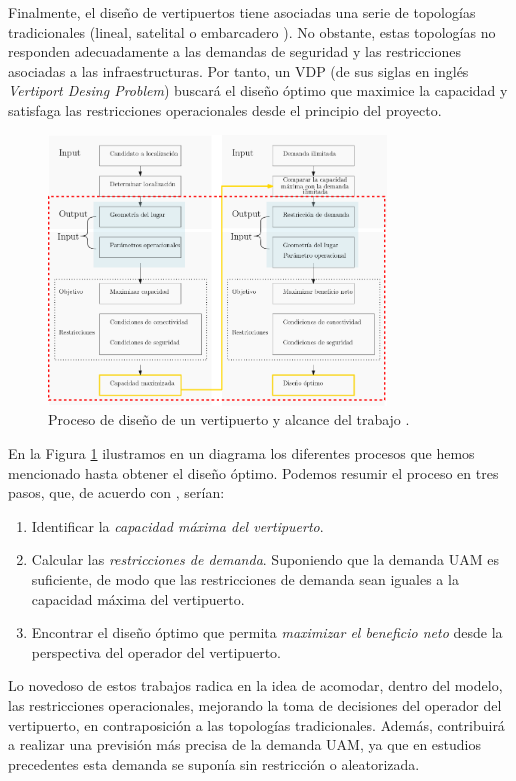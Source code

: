 \documentclass[12pt,a4paper]{book}
\begin{document}
Finalmente, el diseño de vertipuertos tiene asociadas una serie de topologías tradicionales (lineal, satelital o embarcadero \cite{preis_quick_2021}). No obstante, estas topologías no responden adecuadamente a las demandas de seguridad y las restricciones asociadas a las infraestructuras. Por tanto, un VDP (de sus siglas en inglés \textsl{Vertiport Desing Problem}) buscará el diseño óptimo que maximice la capacidad y satisfaga las restricciones operacionales desde el principio del proyecto.

\begin{figure}[h]
    \begin{center}
    \includegraphics[width=0.8\textwidth]{img/proceso_diseno_vertipuerto.png}
    \end{center}
    \caption{Proceso de diseño de un vertipuerto y alcance del trabajo  \cite{park_vertiport_2022}.}
    \label{fig:proceso-diseño-VDP}
\end{figure} 

En la Figura \ref{fig:proceso-diseño-VDP} ilustramos en un diagrama los diferentes procesos que hemos mencionado hasta obtener el diseño óptimo. Podemos resumir el proceso en tres pasos, que, de acuerdo con \cite{park_vertiport_2022}, serían:  
\begin{enumerate}
	\item Identificar la \textsl{capacidad máxima del vertipuerto}. 
	\item Calcular las \textsl{restricciones de demanda}. Suponiendo que la demanda UAM es suficiente, de modo que las restricciones de demanda sean iguales a la capacidad máxima del vertipuerto. 
	\item Encontrar el diseño óptimo que permita \textsl{maximizar el beneficio neto} desde la perspectiva del operador del vertipuerto. 
\end{enumerate} 
Lo novedoso de estos trabajos radica en la idea de acomodar, dentro del modelo, las restricciones operacionales, mejorando la toma de decisiones del operador del vertipuerto, en contraposición a las topologías tradicionales. Además, contribuirá a realizar una previsión más precisa de la demanda UAM, ya que en estudios precedentes esta demanda se suponía sin restricción o aleatorizada. 
\end{document}
